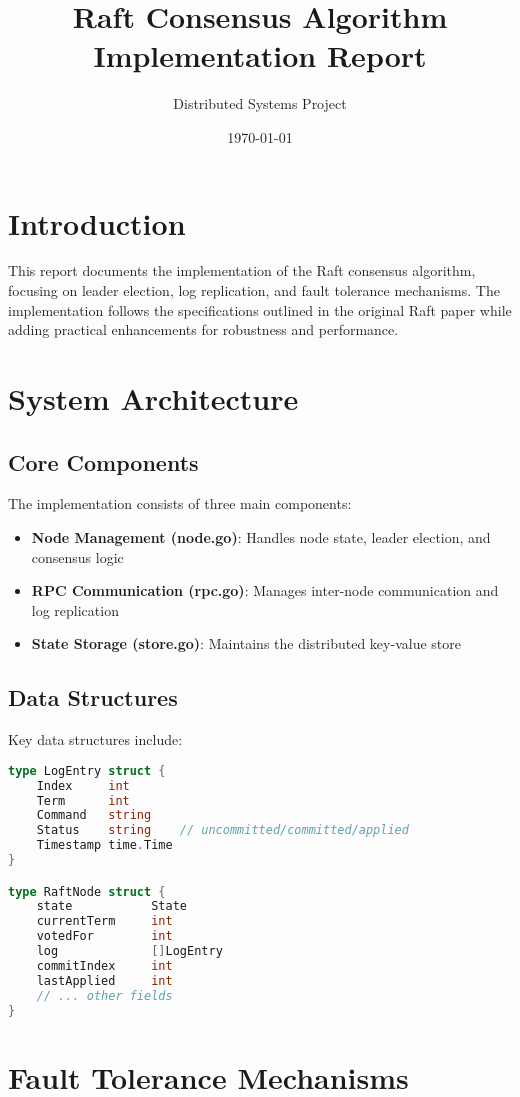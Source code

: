 \documentclass{article}
\title{Raft Consensus Algorithm Implementation Report}
\author{Distributed Systems Project}
\date{\today}
\begin{document}
\maketitle

\section{Introduction}
This report documents the implementation of the Raft consensus algorithm, focusing on leader election, log replication, and fault tolerance mechanisms. The implementation follows the specifications outlined in the original Raft paper while adding practical enhancements for robustness and performance.

\section{System Architecture}

\subsection{Core Components}
The implementation consists of three main components:
\begin{itemize}
    \item \textbf{Node Management (node.go)}: Handles node state, leader election, and consensus logic
    \item \textbf{RPC Communication (rpc.go)}: Manages inter-node communication and log replication
    \item \textbf{State Storage (store.go)}: Maintains the distributed key-value store
\end{itemize}

\subsection{Data Structures}
Key data structures include:
\begin{lstlisting}[language=Go]
type LogEntry struct {
    Index     int
    Term      int
    Command   string
    Status    string    // uncommitted/committed/applied
    Timestamp time.Time
}

type RaftNode struct {
    state           State
    currentTerm     int
    votedFor        int
    log             []LogEntry
    commitIndex     int
    lastApplied     int
    // ... other fields
}
\end{lstlisting}

\section{Fault Tolerance Mechanisms}
\end{document}
